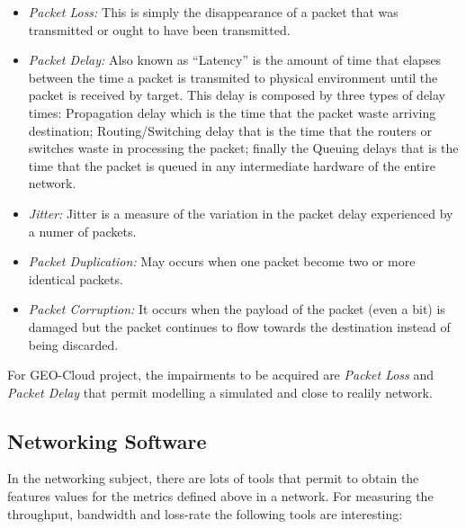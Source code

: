\begin{itemize}
\item \emph{Packet Loss:} This is simply the disappearance of a packet that was
  transmitted or ought to have been transmitted.
\item \emph{Packet Delay:} Also known as ``Latency'' is the amount of time that elapses between the time a
  packet is transmited to physical environment until the packet is received by
  target. This delay is composed by three types of delay times: Propagation
  delay which is the time that the packet waste arriving destination;
  Routing/Switching delay that is the time that the routers or
  switches waste in processing the packet; finally the Queuing delays that is
  the time that the packet is queued in any intermediate hardware of the entire network.
\item \emph{Jitter:} Jitter is a measure of the variation in the packet delay
  experienced by a numer of packets. 
\item \emph{Packet Duplication:} May occurs when one packet become two or more
  identical packets.
\item \emph{Packet Corruption:} It occurs when the payload of the packet (even a bit)
  is damaged but the packet continues to flow towards the destination instead of
  being discarded.
\end{itemize}

For GEO-Cloud project, the impairments to be acquired are \emph{Packet Loss} and
\emph{Packet Delay} that permit modelling a simulated and close to realily network.


\subsection{Networking Software}

In the networking subject, there are lots of tools that permit to obtain the
features values for the metrics defined above in a network. 
For measuring the throughput, bandwidth and loss-rate the following tools are interesting:

